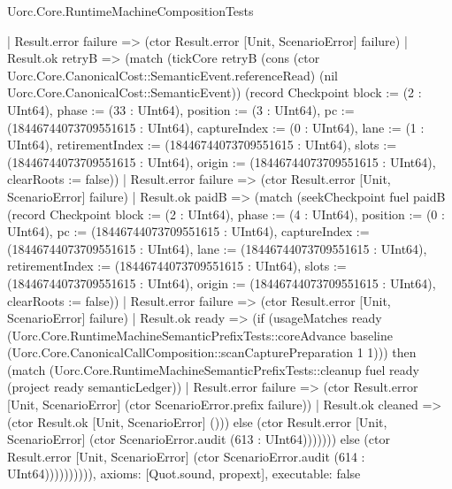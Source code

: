 \begin{lexlean}{Uorc.Core.RuntimeMachineCompositionTests}
\begin{semanticmodule}
{              | Result.error failure => (ctor Result.error [Unit, ScenarioError] failure)
              | Result.ok retryB => (match (tickCore retryB (cons (ctor Uorc.Core.CanonicalCost::SemanticEvent.referenceRead) (nil Uorc.Core.CanonicalCost::SemanticEvent)) (record Checkpoint {block := (2 : UInt64), phase := (33 : UInt64), position := (3 : UInt64), pc := (18446744073709551615 : UInt64), captureIndex := (0 : UInt64), lane := (1 : UInt64), retirementIndex := (18446744073709551615 : UInt64), slots := (18446744073709551615 : UInt64), origin := (18446744073709551615 : UInt64), clearRoots := false}))
                | Result.error failure => (ctor Result.error [Unit, ScenarioError] failure)
                | Result.ok paidB => (match (seekCheckpoint fuel paidB (record Checkpoint {block := (2 : UInt64), phase := (4 : UInt64), position := (0 : UInt64), pc := (18446744073709551615 : UInt64), captureIndex := (18446744073709551615 : UInt64), lane := (18446744073709551615 : UInt64), retirementIndex := (18446744073709551615 : UInt64), slots := (18446744073709551615 : UInt64), origin := (18446744073709551615 : UInt64), clearRoots := false}))
                  | Result.error failure => (ctor Result.error [Unit, ScenarioError] failure)
                  | Result.ok ready => (if (usageMatches ready (Uorc.Core.RuntimeMachineSemanticPrefixTests::coreAdvance baseline (Uorc.Core.CanonicalCallComposition::scanCapturePreparation 1 1))) then (match (Uorc.Core.RuntimeMachineSemanticPrefixTests::cleanup fuel ready (project ready semanticLedger))
                    | Result.error failure => (ctor Result.error [Unit, ScenarioError] (ctor ScenarioError.prefix failure))
                    | Result.ok cleaned => (ctor Result.ok [Unit, ScenarioError] ())) else (ctor Result.error [Unit, ScenarioError] (ctor ScenarioError.audit (613 : UInt64))))))) else (ctor Result.error [Unit, ScenarioError] (ctor ScenarioError.audit (614 : UInt64)))))))))),
  axioms: [Quot.sound, propext],
  executable: false
}


\end{semanticmodule}
\end{lexlean}
